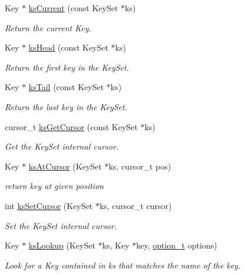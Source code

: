 \begin{DoxyCompactItemize}
Key $\ast$ \mbox{\hyperlink{group__keyset_ga4287b9416912c5f2ab9c195cb74fb094}{ks\+Current}} (const Key\+Set $\ast$ks)
\begin{DoxyCompactList}\small\item\em Return the current Key. \end{DoxyCompactList}\item 
Key $\ast$ \mbox{\hyperlink{group__keyset_gae7dbf3aef70e67b5328475eb3d1f92f5}{ks\+Head}} (const Key\+Set $\ast$ks)
\begin{DoxyCompactList}\small\item\em Return the first key in the Key\+Set. \end{DoxyCompactList}\item 
Key $\ast$ \mbox{\hyperlink{group__keyset_gadca442c4ab43cf532b15091d7711559e}{ks\+Tail}} (const Key\+Set $\ast$ks)
\begin{DoxyCompactList}\small\item\em Return the last key in the Key\+Set. \end{DoxyCompactList}\item 
cursor\+\_\+t \mbox{\hyperlink{group__keyset_gaffe507ab9281c322eb16c3e992075d29}{ks\+Get\+Cursor}} (const Key\+Set $\ast$ks)
\begin{DoxyCompactList}\small\item\em Get the Key\+Set internal cursor. \end{DoxyCompactList}\item 
Key $\ast$ \mbox{\hyperlink{group__keyset_ga3604cc41505f7e19db945cece67190b6}{ks\+At\+Cursor}} (Key\+Set $\ast$ks, cursor\+\_\+t pos)
\begin{DoxyCompactList}\small\item\em return key at given position \end{DoxyCompactList}\item 
int \mbox{\hyperlink{group__keyset_gad94c9ffaa3e8034564c0712fd407c345}{ks\+Set\+Cursor}} (Key\+Set $\ast$ks, cursor\+\_\+t cursor)
\begin{DoxyCompactList}\small\item\em Set the Key\+Set internal cursor. \end{DoxyCompactList}\item 
Key $\ast$ \mbox{\hyperlink{group__keyset_gaa34fc43a081e6b01e4120daa6c112004}{ks\+Lookup}} (Key\+Set $\ast$ks, Key $\ast$key, \mbox{\hyperlink{group__keyset_ga98a3d6a4016c9dad9cbd1a99a9c2a45a}{option\+\_\+t}} options)
\begin{DoxyCompactList}\small\item\em Look for a Key contained in {\ttfamily ks} that matches the name of the {\ttfamily key}. \end{DoxyCompactList}\item 

\end{DoxyCompactItemize}
